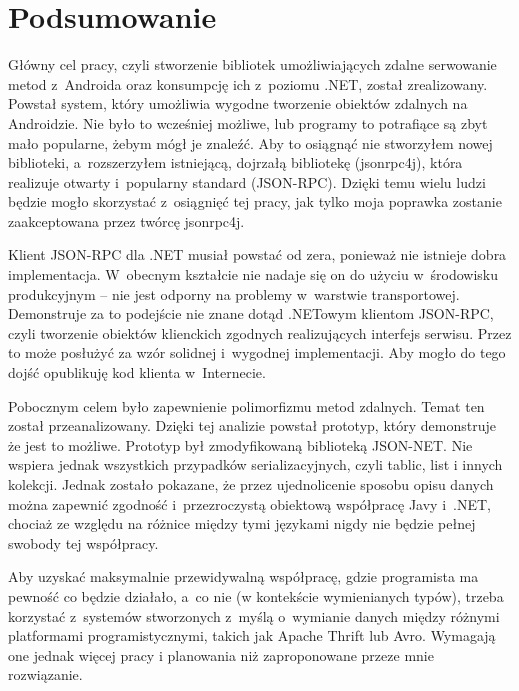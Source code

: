\chapter{Podsumowanie}
Główny cel pracy, czyli stworzenie bibliotek umożliwiających zdalne serwowanie metod z~Androida oraz konsumpcję ich z~poziomu .NET, został zrealizowany.
Powstał system, który umożliwia wygodne tworzenie obiektów zdalnych na Androidzie. Nie było to wcześniej możliwe, lub programy to potrafiące są zbyt mało popularne, żebym mógł je znaleźć.
Aby to osiągnąć nie stworzyłem nowej biblioteki, a~rozszerzyłem istniejącą, dojrzałą bibliotekę (jsonrpc4j), która realizuje otwarty i~popularny standard (JSON-RPC).
Dzięki temu wielu ludzi będzie mogło skorzystać z~osiągnięć tej pracy, jak tylko moja poprawka zostanie zaakceptowana przez twórcę jsonrpc4j.

Klient JSON-RPC dla .NET musiał powstać od zera, ponieważ nie istnieje dobra implementacja.
W~obecnym kształcie nie nadaje się on do użyciu w~środowisku produkcyjnym -- nie jest odporny na problemy w~warstwie transportowej.
Demonstruje za to podejście nie znane dotąd .NETowym klientom JSON-RPC, czyli tworzenie obiektów klienckich zgodnych realizujących interfejs serwisu.
Przez to może posłużyć za wzór solidnej i~wygodnej implementacji.
Aby mogło do tego dojść opublikuję kod klienta w~Internecie.

Pobocznym celem było zapewnienie polimorfizmu metod zdalnych.
Temat ten został przeanalizowany. Dzięki tej analizie powstał prototyp, który demonstruje że jest to możliwe. Prototyp był zmodyfikowaną biblioteką JSON-NET.
Nie wspiera jednak wszystkich przypadków serializacyjnych, czyli tablic, list i innych kolekcji.
Jednak zostało pokazane, że przez ujednolicenie sposobu opisu danych można zapewnić zgodność i~przezroczystą obiektową współpracę Javy i~.NET, chociaż ze względu na różnice między tymi językami nigdy nie będzie pełnej swobody tej współpracy.

Aby uzyskać maksymalnie przewidywalną współpracę, gdzie programista ma pewność co będzie działało, a~co nie (w kontekście wymienianych typów), trzeba korzystać z~systemów stworzonych z~myślą o~wymianie danych między różnymi platformami programistycznymi, takich jak Apache Thrift lub Avro.
Wymagają one jednak więcej pracy i planowania niż zaproponowane przeze mnie rozwiązanie.


